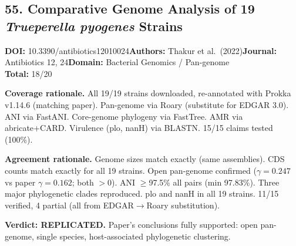 \subsection{55. Comparative Genome Analysis of 19 \textit{Trueperella pyogenes} Strains}
\textbf{DOI:} 10.3390/antibiotics12010024\quad\textbf{Authors:} Thakur et al.\ (2022)\quad\textbf{Journal:} Antibiotics 12, 24\quad\textbf{Domain:} Bacterial Genomics / Pan-genome\\
\quad{}\quad\textbf{Total:} 18/20\par\smallskip
\noindent\textbf{Coverage rationale.} All 19/19 strains downloaded, re-annotated with Prokka v1.14.6 (matching paper). Pan-genome via Roary (substitute for EDGAR 3.0). ANI via FastANI. Core-genome phylogeny via FastTree. AMR via abricate+CARD. Virulence (plo, nanH) via BLASTN. 15/15 claims tested (100\%).\par
\noindent\textbf{Agreement rationale.} Genome sizes match exactly (same assemblies). CDS counts match exactly for all 19 strains. Open pan-genome confirmed ($\gamma=0.247$ vs paper $\gamma=0.162$; both $>0$). ANI $\geq$97.5\% all pairs (min 97.83\%). Three major phylogenetic clades reproduced. plo and nanH in all 19 strains. 11/15 verified, 4 partial (all from EDGAR$\to$Roary substitution).\par\smallskip
\noindent\textbf{Verdict: REPLICATED.} Paper's conclusions fully supported: open pan-genome, single species, host-associated phylogenetic clustering.


\clearpage

